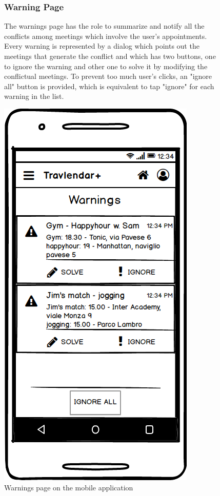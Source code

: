 	\begin{figure}
			\begin{flushleft}
			\subsubsection{Warning Page}
			The warnings page has the role to summarize and notify all the conflicts among meetings which involve the user's appointments. Every warning is represented by a dialog which points out the meetings that generate the conflict and which has two buttons, one to ignore the warning and other one to solve it by modifying the conflictual meetings. 
			To prevent too much user's clicks, an "ignore all" button is provided, which is equivalent to tap "ignore" for each warning in the list. 
		\end{flushleft}
		\centering
		\includegraphics[width=0.6\linewidth]{mockups/Warnings}
		\caption{Warnings page on the mobile application}
		\label{fig:warnings}
	\end{figure}
\clearpage
